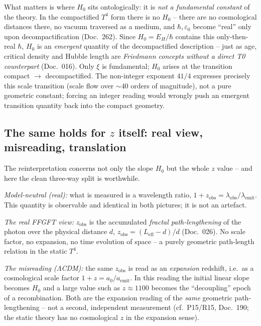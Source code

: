 What matters is where $H_0$ sits ontologically: it is \emph{not a fundamental
constant} of the theory. In the compactified $T^4$ form there is no $H_0$ --
there are no cosmological distances there, no vacuum traversed as a medium, and
$\hbar, \varepsilon_0$ become \enquote{real} only upon decompactification
(Doc.~262). Since $H_0 = E_H/\hbar$ contains this only-then-real $\hbar$, $H_0$
is an \emph{emergent} quantity of the decompactified description -- just as
age, critical density and Hubble length are \emph{Friedmann concepts without a
direct T0 counterpart} (Doc.~016). Only $\xi$ is fundamental; $H_0$ arises at
the transition compact $\to$ decompactified. The non-integer exponent $41/4$
expresses precisely this scale transition (scale flow over $\sim 40$ orders of
magnitude), not a pure geometric constant; forcing an integer reading would
wrongly push an emergent transition quantity back into the compact geometry.

\subsection*{The same holds for $z$ itself: real view, misreading, translation}

The reinterpretation concerns not only the slope $H_0$ but the whole $z$
value -- and here the clean three-way split is worthwhile.

\emph{Model-neutral (real):} what is measured is a wavelength ratio,
$1+z_{\text{obs}} = \lambda_{\text{obs}}/\lambda_{\text{emit}}$. This quantity
is observable and identical in both pictures; it is not an artefact.

\emph{The real FFGFT view:} $z_{\text{obs}}$ is the accumulated \emph{fractal
path-lengthening} of the photon over the physical distance $d$,
$z_{\text{obs}} = (L_{\text{eff}}-d)/d$ (Doc.~026). No scale factor, no
expansion, no time evolution of space -- a purely geometric path-length
relation in the static $T^4$.

\emph{The misreading ($\Lambda$CDM):} the same $z_{\text{obs}}$ is read as an
\emph{expansion} redshift, i.e.\ as a cosmological scale factor
$1+z = a_0/a_{\text{emit}}$. In this reading the initial linear slope becomes
$H_0$ and a large value such as $z\approx 1100$ becomes the
\enquote{decoupling} epoch of a recombination. Both are the expansion reading
of the \emph{same} geometric path-lengthening -- not a second, independent
measurement (cf.\ P15/R15, Doc.~190; the static theory has no cosmological $z$
in the expansion sense).

